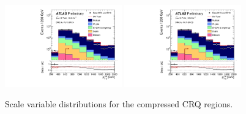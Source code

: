 \begin{figure}[tbp]
\begin{center}
\includegraphics[width=0.45\textwidth]{figures/ATLAS-CONF-2016-078_INT/N-1Plots/AtlasStyle/Preliminary/CRQ_SRJigsawSRC4_LastCut_CRQ_minusone}
\includegraphics[width=0.45\textwidth]{figures/ATLAS-CONF-2016-078_INT/N-1Plots/AtlasStyle/Preliminary/CRQ_SRJigsawSRC5_LastCut_CRQ_minusone}
\end{center}
\caption{Scale variable distributions for the compressed CRQ regions.}
\label{fig:CRQ_SRJigsawSRC1_LastCut_CRQ_minusone}
\end{figure}

